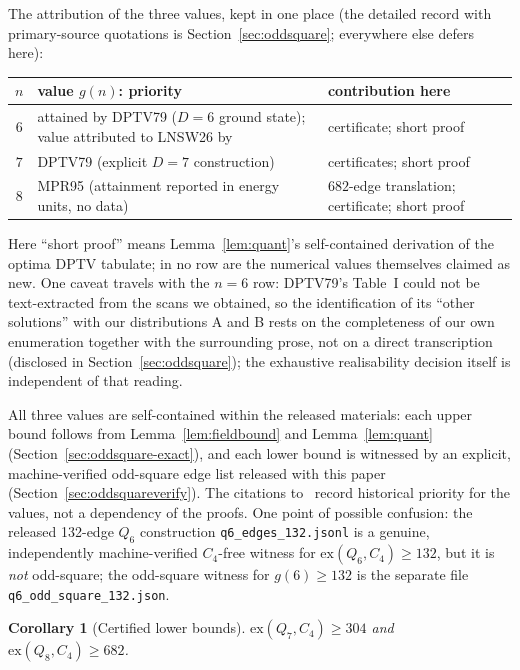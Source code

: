 \documentclass[12pt,a4paper]{article}
\newtheorem{corollary}[theorem]{Corollary}
\theoremstyle{definition}
\newcommand{\ex}{\mathrm{ex}}
\begin{document}
\noindent The attribution of the three values, kept in one place (the
detailed record with primary-source quotations is
Section~\ref{sec:oddsquare}; everywhere else defers here):

\begin{center}\small
\begin{tabular}{@{}c p{6.6cm} p{3.9cm}@{}}
\toprule
$n$ & value $g(n)$: priority & contribution here\\
\midrule
$6$ & attained by DPTV79 ($D{=}6$ ground state); value attributed to LNSW26 by~\cite{Emlek26} & certificate; short proof\\
$7$ & DPTV79 (explicit $D{=}7$ construction) & certificates; short proof\\
$8$ & MPR95 (attainment reported in energy units, no data) & $682$-edge translation; certificate; short proof\\
\bottomrule
\end{tabular}
\end{center}

\noindent Here ``short proof'' means Lemma~\ref{lem:quant}'s self-contained
derivation of the optima DPTV tabulate; in no row are the numerical values
themselves claimed as new. One caveat travels with the $n=6$ row: DPTV79's
Table~I could not be text-extracted from the scans we obtained, so the
identification of its ``other solutions'' with our distributions A and B
rests on the completeness of our own enumeration together with the
surrounding prose, not on a direct transcription (disclosed in
Section~\ref{sec:oddsquare}); the exhaustive realisability decision itself
is independent of that reading.

\noindent All three values are self-contained within the released
materials: each upper bound follows from Lemma~\ref{lem:fieldbound} and
Lemma~\ref{lem:quant} (Section~\ref{sec:oddsquare-exact}), and each
lower bound is witnessed by an explicit, machine-verified odd-square
edge list released with this paper
(Section~\ref{sec:oddsquareverify}). The citations
to~\cite{DPTV79,MPR95} record historical priority for the values, not a
dependency of the proofs. One point of possible confusion: the released
132-edge $Q_6$ construction \texttt{q6\_edges\_132.jsonl} is a genuine,
independently machine-verified $C_4$-free witness for
$\ex(Q_6,C_4)\ge132$, but it is \emph{not} odd-square; the odd-square
witness for $g(6)\ge132$ is the separate file
\texttt{q6\_odd\_square\_132.json}.

\begin{corollary}[Certified lower bounds]\label{thm:main}
$\ex(Q_7,C_4)\ge304$ and $\ex(Q_8,C_4)\ge682$.
\end{corollary}
\end{document}
